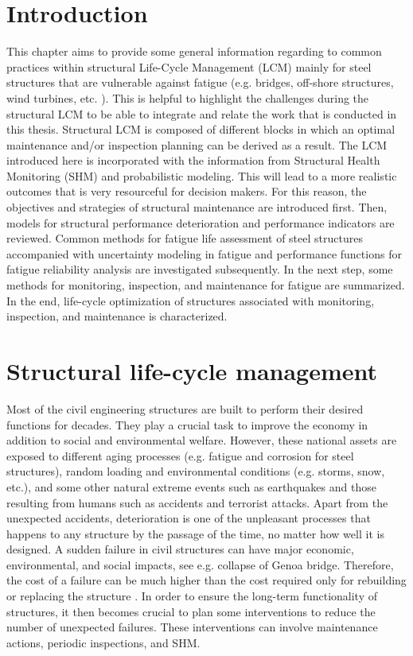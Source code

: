 
\newpage

\section{Introduction}

\noindent
This chapter aims to provide some general information regarding to common practices within structural Life-Cycle Management (LCM) mainly for steel structures that are vulnerable against 
fatigue (e.g. bridges, off-shore structures, wind turbines, etc. ). This is helpful to highlight the challenges during the structural LCM to be able to integrate and relate the work 
that is conducted in this thesis. Structural LCM is composed of different blocks in which an optimal maintenance and/or inspection planning can be derived as a result. The LCM introduced 
here is incorporated with the information from Structural Health Monitoring (SHM) and probabilistic modeling. This will lead to a more realistic outcomes that is very resourceful for decision
makers. For this reason, the objectives and strategies of structural maintenance are introduced first. Then, models for structural performance deterioration and performance indicators are 
reviewed. Common methods for fatigue life assessment of steel structures accompanied with uncertainty modeling in fatigue and performance functions for fatigue reliability analysis are 
investigated subsequently. In the next step, some methods for monitoring, inspection, and maintenance for fatigue are summarized. In the end, life-cycle optimization of structures associated
with monitoring, inspection, and maintenance is characterized. 


\section{Structural life-cycle management}

\noindent
Most of the civil engineering structures are built to perform their desired functions for decades. They play a crucial task to improve the economy in addition to social and environmental
welfare. However, these national assets are exposed to different aging processes (e.g. fatigue and corrosion for steel structures), random loading and environmental conditions (e.g. 
storms, snow, etc.), and some other natural extreme events such as earthquakes and those resulting from humans such as accidents and terrorist attacks. Apart from the unexpected accidents, 
deterioration is one of the unpleasant processes that happens to any structure by the passage of the time, no matter how well it is designed. A sudden failure in civil structures can have 
major economic, environmental, and social impacts, see e.g. collapse of Genoa bridge. Therefore, the cost of a failure can be much higher than the cost required only for rebuilding or 
replacing the structure \citep{Dong2013, Bocchini2014}. In order to ensure the long-term functionality of structures, it then becomes crucial to plan some interventions to reduce the 
number of unexpected failures. These interventions can involve maintenance actions, periodic inspections, and SHM. 

